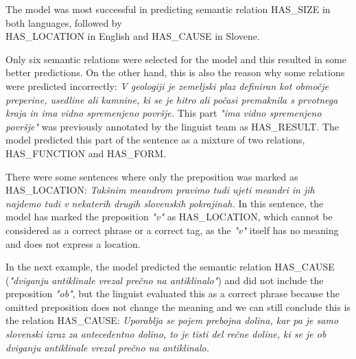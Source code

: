 \documentclass[fleqn,moreauthors,10pt]{ds_report}
\begin{document}
The model was most successful in predicting semantic relation HAS\_SIZE in both languages, followed by \\ HAS\_LOCATION in English and HAS\_CAUSE in Slovene.

Only six semantic relations were selected for the model and this resulted in some better predictions. On the other hand, this is also the reason why some relations were predicted incorrectly: \emph{V geologiji je zemeljski plaz definiran kot območje preperine, usedline ali kamnine, ki se je hitro ali počasi premaknila s prvotnega kraja in ima vidno spremenjeno površje.}
This part \emph{"ima vidno spremenjeno površje"} was previously annotated by the linguist team as HAS\_RESULT. The model predicted this part of the sentence as a mixture of two relations, HAS\_FUNCTION and HAS\_FORM.

There were some sentences where only the preposition was marked as HAS\_LOCATION: \emph{Takšnim meandrom pravimo tudi ujeti meandri in jih najdemo tudi v nekaterih drugih slovenskih pokrajinah.}
In this sentence, the model has marked the preposition \emph{"v"} as HAS\_LOCATION, which cannot be considered as a correct phrase or a correct tag, as the \emph{"v"} itself has no meaning and does not express a location.

In the next example, the model predicted the semantic relation HAS\_CAUSE (\emph{"dviganju antiklinale vrezal prečno na antiklinalo"}) and did not include the preposition \emph{"ob"}, but the linguist evaluated this as a correct phrase because the omitted preposition does not change the meaning and we can still conclude this is the relation HAS\_CAUSE: \emph{Uporablja se pojem prebojna dolina, kar pa je samo slovenski izraz za antecedentno dolino, to je tisti del rečne doline, ki se je ob dviganju antiklinale vrezal prečno na antiklinalo.}
\end{document}
